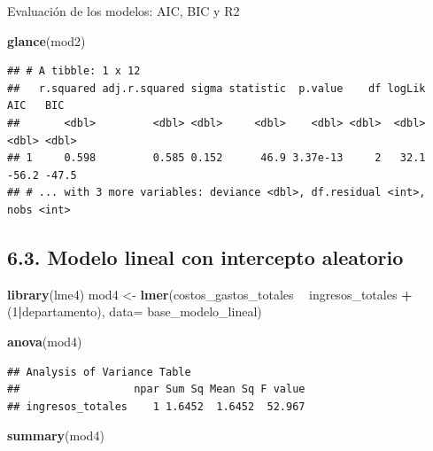 \documentclass[
  11pt,
  a4paper,
]{book}
\newenvironment{Shaded}{\begin{snugshade}}{\end{snugshade}}
\newcommand{\DataTypeTok}[1]{\textcolor[rgb]{0.13,0.29,0.53}{#1}}
\newcommand{\DecValTok}[1]{\textcolor[rgb]{0.00,0.00,0.81}{#1}}
\newcommand{\KeywordTok}[1]{\textcolor[rgb]{0.13,0.29,0.53}{\textbf{#1}}}
\newcommand{\NormalTok}[1]{#1}
\newcommand{\OperatorTok}[1]{\textcolor[rgb]{0.81,0.36,0.00}{\textbf{#1}}}
\newcommand{\StringTok}[1]{\textcolor[rgb]{0.31,0.60,0.02}{#1}}
\begin{document}
Evaluación de los modelos: AIC, BIC y R2

\begin{Shaded}
\begin{Highlighting}[]
\KeywordTok{glance}\NormalTok{(mod2)}
\end{Highlighting}
\end{Shaded}

\begin{verbatim}
## # A tibble: 1 x 12
##   r.squared adj.r.squared sigma statistic  p.value    df logLik   AIC   BIC
##       <dbl>         <dbl> <dbl>     <dbl>    <dbl> <dbl>  <dbl> <dbl> <dbl>
## 1     0.598         0.585 0.152      46.9 3.37e-13     2   32.1 -56.2 -47.5
## # ... with 3 more variables: deviance <dbl>, df.residual <int>, nobs <int>
\end{verbatim}

\hypertarget{modelo-lineal-con-intercepto-aleatorio}{%
\subsection{6.3. Modelo lineal con intercepto
aleatorio}\label{modelo-lineal-con-intercepto-aleatorio}}

\begin{Shaded}
\begin{Highlighting}[]
\KeywordTok{library}\NormalTok{(lme4)}
\NormalTok{mod4 <-}\StringTok{ }\KeywordTok{lmer}\NormalTok{(costos_gastos_totales }\OperatorTok{~}\StringTok{ }\NormalTok{ingresos_totales }\OperatorTok{+}\StringTok{ }\NormalTok{(}\DecValTok{1}\OperatorTok{|}\NormalTok{departamento), }
             \DataTypeTok{data=}\NormalTok{ base_modelo_lineal) }

\KeywordTok{anova}\NormalTok{(mod4)}
\end{Highlighting}
\end{Shaded}

\begin{verbatim}
## Analysis of Variance Table
##                  npar Sum Sq Mean Sq F value
## ingresos_totales    1 1.6452  1.6452  52.967
\end{verbatim}

\begin{Shaded}
\begin{Highlighting}[]
\KeywordTok{summary}\NormalTok{(mod4)}
\end{Highlighting}
\end{Shaded}
\end{document}
